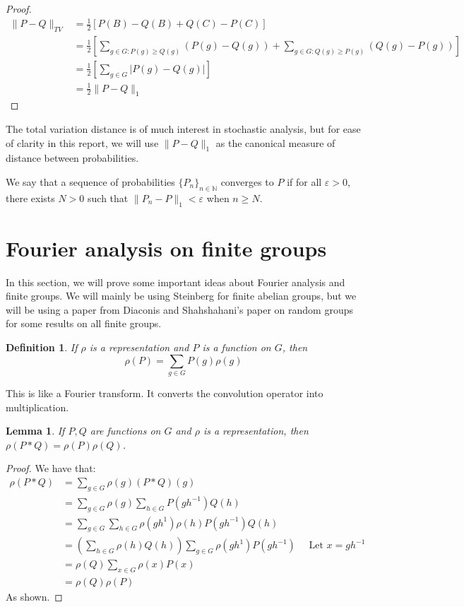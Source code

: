 \documentclass[]{article}
\newtheorem{lemma}[theorem]{Lemma}
\newtheorem{definition}[theorem]{Definition}
\theoremstyle{definition}
\numberwithin{theorem}{section}
\numberwithin{equation}{section}
\begin{document}
\begin{proof}
	\begin{align*}
		\|P - Q\|_{TV} &= \frac{1}{2}[P(B) - Q(B) + Q(C) - P(C)]\\
		&=\frac{1}{2}\left[ \sum_{g \in G : P(g) \geq Q(g)} (P(g) - Q(g)) + \sum_{g \in G : Q(g) \geq P(g)} (Q(g) - P(g)) \right]\\
		&= \frac{1}{2}\left[ \sum_{g \in G}|P(g) - Q(g)| \right]\\
		&= \frac{1}{2}\|P - Q\|_1
	\end{align*}
\end{proof}

The total variation distance is of much interest in stochastic analysis, but for ease of clarity in this report, we will use $\|P - Q\|_1$ as the canonical measure of distance between probabilities. 

We say that a sequence of probabilities $\lbrace P_n \rbrace_{n \in \mathbb{N}}$ converges to $P$ if for all $\varepsilon > 0$, there exists $N > 0$ such that $\|P_n - P \|_1 < \varepsilon$ when $n \geq N$. 

\section{Fourier analysis on finite groups}
In this section, we will prove some important ideas about Fourier analysis and finite groups. We will mainly be using Steinberg \cite{steinbergProbabilityRandomWalks2012} for finite abelian groups, but we will be using a paper from Diaconis and Shahshahani's paper on random groups \cite{diaconisGeneratingRandomPermutation1981} for some results on all finite groups. 

\begin{definition}
	If $\rho$ is a representation and $P$ is a function on $G$, then
	\begin{equation}
		\rho(P) = \sum_{g \in G} P(g) \rho(g)
	\end{equation}
\end{definition}

This is like a Fourier transform. It converts the convolution operator into multiplication.

\begin{lemma}
	If $P, Q$ are functions on $G$ and $\rho$ is a representation, then $\rho(P \ast Q) = \rho(P) \rho(Q)$.
\end{lemma}

\begin{proof}
	We have that:
	\begin{align*}
		\rho(P \ast Q) &= \sum_{g \in G} \rho(g) (P \ast Q)(g)\\
		&= \sum_{g \in G} \rho(g) \sum_{h \in G} P(g h^{-1}) Q(h)\\
		&= \sum_{g \in G}\sum_{h \in G} \rho(gh^{1}) \rho(h)  P(g h^{-1}) Q(h)\\
		&= \left(\sum_{h \in G}  \rho(h) Q(h)\right) \sum_{g \in G} \rho(gh^{1})P(g h^{-1}) \quad \text{ Let } x = gh^{-1} \\
		&= \rho(Q) \sum_{x \in G} \rho(x) P(x)\\
		&= \rho(Q) \rho(P)
	\end{align*}
	As shown. 
\end{proof}
\end{document}
